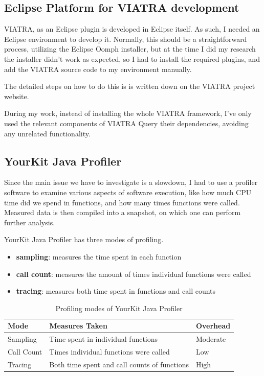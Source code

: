 \documentclass[11pt,a4paper,oneside]{report}
\begin{document}
\subsection{Eclipse Platform for VIATRA development}
VIATRA, as an Eclipse plugin is developed in Eclipse itself. As such, I needed
an Eclipse environment to develop it. Normally, this should be a straightforward
process, utilizing the Eclipse Oomph installer, but at the time I did my
research the installer didn't work as expected, so I had to install the required
plugins, and add the VIATRA source code to my environment manually.

The detailed steps on how to do this is is written down on the VIATRA project
website\cite{ujhelyi_harmath_david_nagy_hegedus_2019}.

During my work, instead of installing the whole VIATRA framework, I've only
used the relevant components of VIATRA Query their dependencies, avoiding any
unrelated functionality.

\subsection{YourKit Java Profiler}
Since the main issue we have to investigate is a slowdown, I had to use a
profiler software to examine various aspects of software execution, like how
much CPU time did we spend in functions, and how many times functions were
called. Measured data is then compiled into a snapshot, on which one can perform
further analysis.

YourKit Java Profiler has three modes of profiling.
\begin{itemize}
    \item{\textbf{sampling}: measures the time spent in each function}
    \item{\textbf{call count}: measures the amount of times individual functions were called}
    \item{\textbf{tracing}: measures both time spent in functions and call counts}
\end{itemize}

\begin{table}[ht]
    \footnotesize
    \centering
    \begin{tabular}{ l l l }
        \toprule
        Mode & Measures Taken & Overhead \\
        \midrule
        Sampling & Time spent in individual functions & Moderate \\
        Call Count & Times individual functions were called & Low \\
        Tracing & Both time spent and call counts of functions & High \\
        \bottomrule
    \end{tabular}
    \caption{Profiling modes of YourKit Java Profiler}
    \label{tab:profiler-modes}
\end{table}
\end{document}

